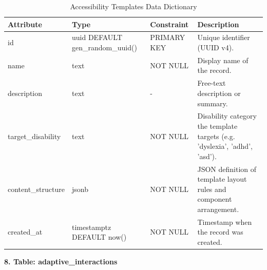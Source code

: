 \documentclass[12pt, oneside]{article} %
\newcommand{\tabbreak}{\hyphenpenalty=200\exhyphenpenalty=200\tolerance=4000\hbadness=10000\hspace{0pt}}
\begin{document}
\begin{table}[H]
\caption{Accessibility Templates Data Dictionary}
\label{tab:dd_accessibility_templates}
\vspace{-4mm}
\begin{center}
\renewcommand{\arraystretch}{1.15}
\scriptsize
\begin{tabular}{|>{\raggedright\arraybackslash\tabbreak}p{2.67cm}|>{\raggedright\arraybackslash\tabbreak}p{2.93cm}|>{\raggedright\arraybackslash\tabbreak}p{2.67cm}|>{\raggedright\arraybackslash\tabbreak}p{4.51cm}|}
\hline
\textbf{Attribute} & \textbf{Type} & \textbf{Constraint} & \textbf{Description} \\ \hline
id & uuid DEFAULT gen\_random\_uuid() & PRIMARY KEY & Unique identifier (UUID v4). \\ \hline
name & text & NOT NULL & Display name of the record. \\ \hline
description & text & - & Free-text description or summary. \\ \hline
target\_disability & text & NOT NULL & Disability category the template targets (e.g. 'dyslexia', 'adhd', 'asd'). \\ \hline
content\_structure & jsonb & NOT NULL & JSON definition of template layout rules and component arrangement. \\ \hline
created\_at & timestamptz DEFAULT now() & NOT NULL & Timestamp when the record was created. \\ \hline
\end{tabular}
\end{center}
\end{table}

\textbf{8. Table: adaptive\_interactions}
\end{document}
